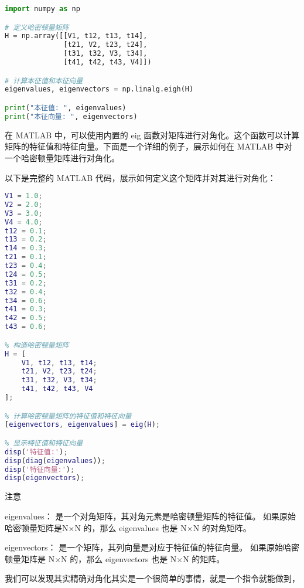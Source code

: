 \begin{lstlisting}[language=python]
import numpy as np

# 定义哈密顿量矩阵
H = np.array([[V1, t12, t13, t14],
              [t21, V2, t23, t24],
              [t31, t32, V3, t34],
              [t41, t42, t43, V4]])

# 计算本征值和本征向量
eigenvalues, eigenvectors = np.linalg.eigh(H)

print("本征值: ", eigenvalues)
print("本征向量: ", eigenvectors)

\end{lstlisting}
在 MATLAB 中，可以使用内置的 eig 函数对矩阵进行对角化。这个函数可以计算矩阵的特征值和特征向量。下面是一个详细的例子，展示如何在 MATLAB 中对一个哈密顿量矩阵进行对角化。

以下是完整的 MATLAB 代码，展示如何定义这个矩阵并对其进行对角化：

\begin{lstlisting}[language=matlab]
% 定义哈密顿量矩阵的元素
V1 = 1.0;
V2 = 2.0;
V3 = 3.0;
V4 = 4.0;
t12 = 0.1;
t13 = 0.2;
t14 = 0.3;
t21 = 0.1;
t23 = 0.4;
t24 = 0.5;
t31 = 0.2;
t32 = 0.4;
t34 = 0.6;
t41 = 0.3;
t42 = 0.5;
t43 = 0.6;

% 构造哈密顿量矩阵
H = [
    V1, t12, t13, t14;
    t21, V2, t23, t24;
    t31, t32, V3, t34;
    t41, t42, t43, V4
];

% 计算哈密顿量矩阵的特征值和特征向量
[eigenvectors, eigenvalues] = eig(H);

% 显示特征值和特征向量
disp('特征值:');
disp(diag(eigenvalues));
disp('特征向量:');
disp(eigenvectors);

\end{lstlisting}
注意

eigenvalues：
是一个对角矩阵，其对角元素是哈密顿量矩阵的特征值。
如果原始哈密顿量矩阵是N×N 的，那么 eigenvalues 也是 N×N 的对角矩阵。

eigenvectors：
是一个矩阵，其列向量是对应于特征值的特征向量。
如果原始哈密顿量矩阵是 N×N 的，那么 eigenvectors 也是 N×N 的矩阵。

我们可以发现其实精确对角化其实是一个很简单的事情，就是一个指令就能做到，